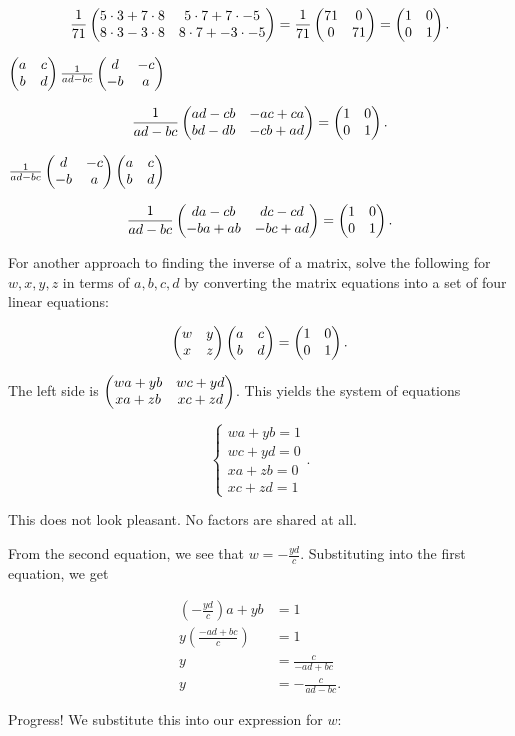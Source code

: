 \documentclass[../gatm_answers.tex]{subfiles}
\begin{document}
$$\frac{1}{71}\begin{pmatrix} 5 \cdot 3 + 7\cdot 8 & 5\cdot 7 + 7\cdot -5 \\ 8\cdot 3 - 3\cdot 8 & 8\cdot 7 + -3\cdot -5 \end{pmatrix} = \frac{1}{71}\begin{pmatrix} 71 & 0 \\ 0 & 71 \end{pmatrix} = \begin{pmatrix} 1 & 0 \\ 0 & 1 \end{pmatrix}.$$

\begin{inner_problem}
\item $\begin{pmatrix} a & c \\ b & d \end{pmatrix}\frac{1}{ad-bc}\begin{pmatrix} d & -c \\ -b & a \end{pmatrix}$
\end{inner_problem}

$$\frac{1}{ad-bc}\begin{pmatrix} ad-cb & -ac+ca \\ bd-db & -cb+ad \end{pmatrix}=\begin{pmatrix} 1 & 0 \\ 0 & 1 \end{pmatrix}.$$

\begin{inner_problem}
\item $\frac{1}{ad-bc}\begin{pmatrix} d & -c \\ -b & a \end{pmatrix}\begin{pmatrix} a & c \\ b & d \end{pmatrix}$
\end{inner_problem}

$$\frac{1}{ad-bc}\begin{pmatrix} da-cb & dc-cd \\ -ba+ab & -bc+ad \end{pmatrix}=\begin{pmatrix} 1 & 0 \\ 0 & 1 \end{pmatrix}.$$

\begin{outer_problem}
\item For another approach to finding the inverse of a matrix, solve the following for $w,x,y,z$ in terms of $a,b,c,d$ by converting the matrix equations into a set of four linear equations:

$$\begin{pmatrix} w & y \\ x & z \end{pmatrix}\begin{pmatrix} a & c \\ b & d \end{pmatrix}=\begin{pmatrix} 1 & 0 \\ 0 & 1 \end{pmatrix}.$$
\end{outer_problem}

The left side is $\begin{pmatrix} wa+yb & wc+yd \\ xa+zb & xc+zd \end{pmatrix}$. This yields the system of equations

$$\begin{cases} wa+yb = 1 \\ wc+yd = 0 \\ xa+zb = 0 \\ xc+zd = 1 \end{cases}.$$

This does not look pleasant. No factors are shared at all.

From the second equation, we see that $w=-\frac{yd}{c}$. Substituting into the first equation, we get

\begin{align*}
\left(-\frac{yd}{c}\right)a + yb &= 1 \\
y\left(\frac{-ad+bc}{c}\right) & =1 \\
y &= \frac{c}{-ad+bc} \\
y &= -\frac{c}{ad-bc}.
\end{align*}

Progress! We substitute this into our expression for $w$:
\end{document}
